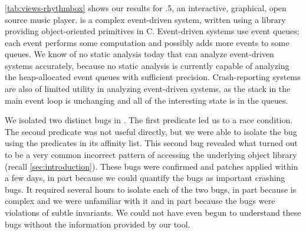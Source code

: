 \subsubsection{\rhythmbox}

\autoref{tab:views-rhythmbox} shows our results for .5, an interactive, graphical, open source music player.
\rhythmbox is a complex event-driven system, written using
a library providing object-oriented primitives in C.  Event-driven
systems use event queues; each event performs some computation and
possibly adds more events to some queues.  We know of no static
analysis today that can analyze event-driven systems accurately,
because no static analysis is currently capable of analyzing the
heap-allocated event queues with sufficient precision.
Crash-reporting systems are also of limited utility in analyzing
event-driven systems, as the stack in the main event loop is
unchanging and all of the interesting state is in the queues.

We isolated two distinct bugs in \rhythmbox.  The first predicate led
us to a race condition.  The second predicate was not useful directly,
but we were able to isolate the bug using the predicates in its
affinity list.  This second bug revealed what turned out to be a very
common incorrect pattern of accessing the underlying object library
(recall \autoref{sec:introduction}).  These bugs
were confirmed and patches applied within a few days, in part because
we could quantify the bugs as important crashing bugs.  It required
several hours to isolate each of the two bugs, in part because \rhythmbox
is complex and we were unfamiliar with it and in part because the bugs
were violations of subtle invariants.  We could not have even begun to
understand these bugs without the information provided by our tool.
